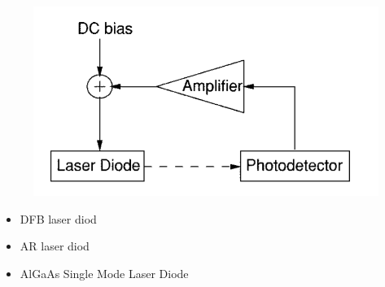 

\begin{minipage}{0.45\textwidth}
\begin{figure}[h]
    \centering
    \includegraphics[width=1.1\textwidth]{images/55.png}
\end{figure}
\end{minipage}
\hfill
\begin{minipage}{0.45\textwidth}
\begin{itemize}
     \item DFB laser diod
     \item AR laser diod
     \item AlGaAs Single Mode Laser Diode
 \end{itemize} 
\end{minipage}

